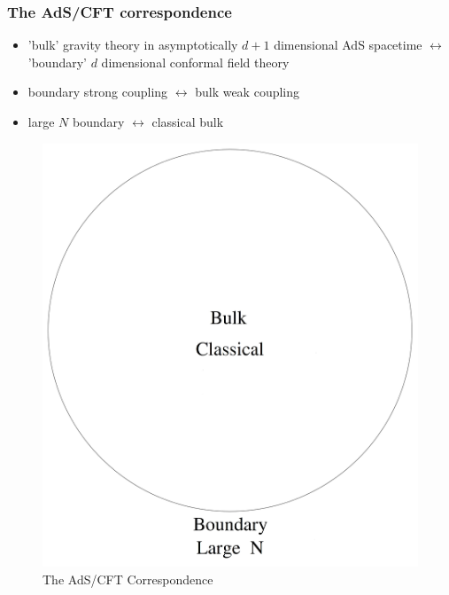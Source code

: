 \documentclass[10pt,aspectratio=169]{beamer}
\begin{document}
\begin{frame}
\frametitle{The AdS/CFT correspondence}

\begin{minipage}[t]{0.48\linewidth}

\begin{itemize}

\item 'bulk' gravity theory in asymptotically $d+1$ dimensional AdS spacetime $\leftrightarrow$ 'boundary' $d$ dimensional conformal field theory

\item boundary strong coupling $\leftrightarrow$ bulk weak coupling

\item large $N$ boundary $\leftrightarrow$ classical bulk

\end{itemize}

\end{minipage}
%
\hfill
%
\begin{minipage}[t]{0.48\linewidth}

\begin{figure}
    \begin{center}
    
        \includegraphics[scale=0.06]{adscft3}    
    
    \end{center}
    \caption{The AdS/CFT Correspondence}
\end{figure}

\end{minipage}

\end{frame}
\end{document}
